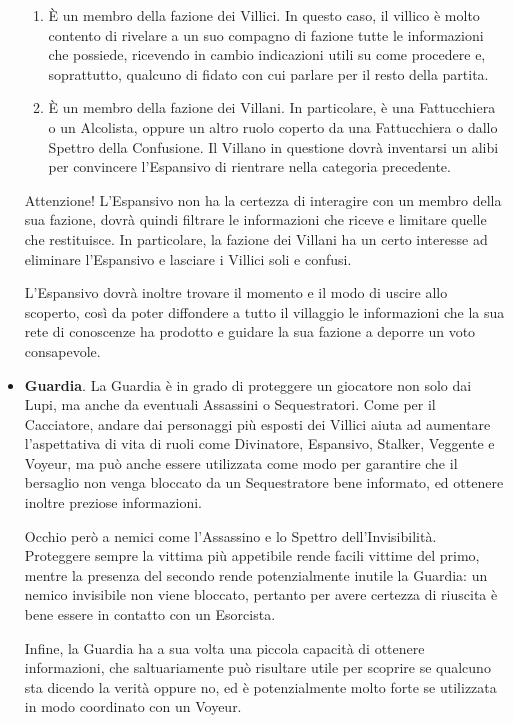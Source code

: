 \documentclass[a4paper,10pt]{article}
\begin{document}
\begin{itemize}
	\begin{enumerate}
	    \item È un membro della fazione dei Villici. In questo caso, il villico è molto contento di rivelare a un suo compagno di fazione tutte le informazioni che possiede, ricevendo in cambio indicazioni utili su come procedere e, soprattutto, qualcuno di fidato con cui parlare per il resto della partita.
	    \item È un membro della fazione dei Villani. In particolare, è una Fattucchiera o un Alcolista, oppure un altro ruolo coperto da una Fattucchiera o dallo Spettro della Confusione. Il Villano in questione dovrà inventarsi un alibi per convincere l'Espansivo di rientrare nella categoria precedente.
	\end{enumerate}
	
	Attenzione! L'Espansivo non ha la certezza di interagire con un membro della sua fazione, dovrà quindi filtrare le informazioni che riceve e limitare quelle che restituisce. In particolare, la fazione dei Villani ha un certo interesse ad eliminare l'Espansivo e lasciare i Villici soli e confusi.

    L'Espansivo dovrà inoltre trovare il momento e il modo di uscire allo scoperto, così da poter diffondere a tutto il villaggio le informazioni che la sua rete di conoscenze ha prodotto e guidare la sua fazione a deporre un voto consapevole.
	
	\item {\bf Guardia}. La Guardia è in grado di proteggere un giocatore non solo dai Lupi, ma anche da eventuali Assassini o Sequestratori. Come per il Cacciatore, andare dai personaggi più esposti dei Villici aiuta ad aumentare l'aspettativa di vita di ruoli come Divinatore, Espansivo, Stalker, Veggente e Voyeur, ma può anche essere utilizzata come modo per garantire che il bersaglio non venga bloccato da un Sequestratore bene informato, ed ottenere inoltre preziose informazioni.
	
    Occhio però a nemici come l'Assassino e lo Spettro dell'Invisibilità. Proteggere sempre la vittima più appetibile rende facili vittime del primo, mentre la presenza del secondo rende potenzialmente inutile la Guardia: un nemico invisibile non viene bloccato, pertanto per avere certezza di riuscita è bene essere in contatto con un Esorcista.
	
	Infine, la Guardia ha a sua volta una piccola capacità di ottenere informazioni, che saltuariamente può risultare utile per scoprire se qualcuno sta dicendo la verità oppure no, ed è potenzialmente molto forte se utilizzata in modo coordinato con un Voyeur.
	

\end{itemize}
\end{document}
